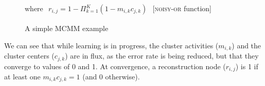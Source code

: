 \begin{figure}[htb!]
\begin{center}
{
\label{fig:example:subfig2}
}

\begin{framed}
	\centering
	\small
	where
	$\begin{aligned}
	   r_{i,j} = 1 - \Pi_{k=1}^{K} (1 - m_{i,k}c_{j,k}) 
	\end{aligned}$
        \hspace{2em}
        [\textsc{noisy-or} function]
\end{framed}

\end{center}
\caption{A simple MCMM example} %
\label{fig:example}
\end{figure}

We can see that while learning is in progress, the cluster activities
($m_{i,k}$) and the cluster centers ($c_{j,k}$) are in flux, as the
error rate is being reduced, but that they converge to values of 0 and
1.  At convergence, a reconstruction node ($r_{i,j}$) is 1 if at least one
$m_{i,k}c_{j,k} = 1$ (and 0 otherwise).


	
	
	
